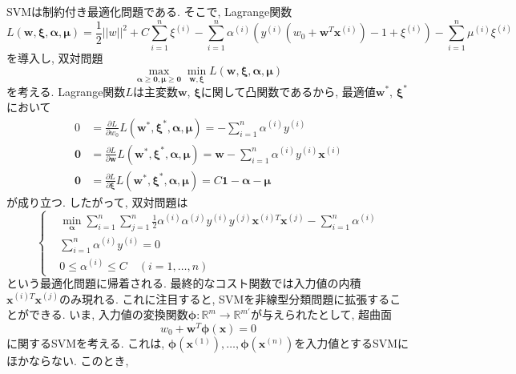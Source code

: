 \documentclass[uplatex]{jsarticle}
\theoremstyle{definition}
\numberwithin{equation}{section}
\newcommand{\R}{\mathbb{R}}
\newcommand{\norm}[1]{\left|\left|#1\right|\right|}
\begin{document}
SVMは制約付き最適化問題である.
そこで, Lagrange関数
\begin{equation}
    L(\bm{w}, \bm{\xi}, \bm{\alpha}, \bm{\mu}) = \frac{1}{2}\norm{w}^{2} + C\sum_{i = 1}^{n} \xi^{(i)} - \sum_{i = 1}^{n} \alpha^{(i)}(y^{(i)}(w_{0} + \bm{w}^{T}\bm{x}^{(i)}) - 1 + \xi^{(i)}) - \sum_{i = 1}^{n} \mu^{(i)}\xi^{(i)}
\end{equation}
を導入し, 双対問題
\begin{equation}
    \max_{\bm{\alpha} \geq \bm{0}, \bm{\mu} \geq \bm{0}} \min_{\bm{w}, \bm{\xi}} L(\bm{w}, \bm{\xi}, \bm{\alpha}, \bm{\mu})
\end{equation}
を考える.
Lagrange関数$L$は主変数$\bm{w}$, $\bm{\xi}$に関して凸関数であるから, 最適値$\bm{w}^{*}$, $\bm{\xi}^{*}$において
\begin{align}
    0 &= \frac{\partial L}{\partial w_{0}}L(\bm{w}^{*}, \bm{\xi}^{*}, \bm{\alpha}, \bm{\mu}) = -\sum_{i = 1}^{n} \alpha^{(i)}y^{(i)} \\
    \bm{0} &= \frac{\partial L}{\partial \bm{w}}L(\bm{w}^{*}, \bm{\xi}^{*}, \bm{\alpha}, \bm{\mu}) = \bm{w} - \sum_{i = 1}^{n} \alpha^{(i)}y^{(i)}\bm{x}^{(i)} \\
    \bm{0} &= \frac{\partial L}{\partial \bm{\xi}}L(\bm{w}^{*}, \bm{\xi}^{*}, \bm{\alpha}, \bm{\mu}) = C\bm{1} - \bm{\alpha} - \bm{\mu}
\end{align}
が成り立つ.
したがって, 双対問題は
\begin{equation}
    \left\{
        \begin{aligned}
            & \min_{\bm{\alpha}} \sum_{i = 1}^{n} \sum_{j = 1}^{n} \frac{1}{2}\alpha^{(i)}\alpha^{(j)}y^{(i)}y^{(j)}\bm{x}^{(i)T}\bm{x}^{(j)} - \sum_{i = 1}^{n} \alpha^{(i)} \\
            & \sum_{i = 1}^{n} \alpha^{(i)}y^{(i)} = 0 \\
            & 0 \leq \alpha^{(i)} \leq C \quad (i = 1, \dots, n)
        \end{aligned}
    \right.
\end{equation}
という最適化問題に帰着される.
最終的なコスト関数では入力値の内積$\bm{x}^{(i)T}\bm{x}^{(j)}$のみ現れる.
これに注目すると, SVMを非線型分類問題に拡張することができる.
いま, 入力値の変換関数$\bm{\phi} \colon \R^{m} \to \R^{m'}$が与えられたとして, 超曲面
\begin{equation}
    w_{0} + \bm{w}^{T}\bm{\phi}(\bm{x}) = 0
\end{equation}
に関するSVMを考える.
これは, $\bm{\phi}(\bm{x}^{(1)}), \dots, \bm{\phi}(\bm{x}^{(n)})$を入力値とするSVMにほかならない.
このとき, 
\end{document}
